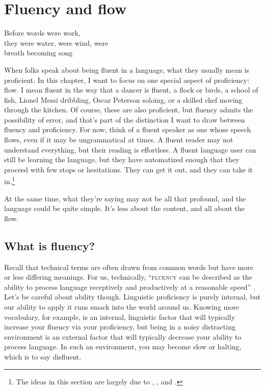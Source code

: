 \chapter{Fluency and flow} \label{ch:fluency}

\epigraph{Before words were work,\\
they were water, were wind, were\\
breath becoming song}{}

When folks speak about being fluent in a language, what they usually mean is proficient. In this chapter, I want to focus on one special aspect of proficiency: flow. I mean fluent in the way that a dancer is fluent, a flock or birds, a school of fish, Lionel Messi dribbling, Oscar Peterson soloing, or a skilled chef moving through the kitchen. Of course, these are also proficient, but fluency admits the possibility of error, and that's part of the distinction I want to draw between fluency and proficiency. For now, think of a fluent speaker as one whose speech flows, even if it may be ungrammatical at times. A fluent reader may not understand everything, but their reading is effortless. A fluent language user can still be learning the language, but they have automatized enough that they proceed with few stops or hesitations. They can get it out, and they can take it in.\footnote{The ideas in this section are largely due to \citet{Robinson2011}, \citet{Segalowitz2010}, and \citet{Skehan2003}.}

At the same time, what they're saying may not be all that profound, and the language could be quite simple. It's less about the content, and all about the flow.

\section{What is fluency?} \label{sec:what-is-fluency}

Recall that technical terms are often drawn from common words but have more or less differing meanings. For us, technically, ``\textsc{fluency} can be described as the ability to process language receptively and productively at a reasonable speed'' \citep[11]{Nation2014b}. Let's be careful about ability though. Linguistic proficiency is purely internal, but our ability to apply it runs smack into the world around us. Knowing more vocabulary, for example, is an internal, linguistic factor that will typically increase your fluency via your proficiency, but being in a noisy distracting environment is an external factor that will typically decrease your ability to process language. In such an environment, you may become slow or halting, which is to say disfluent.


